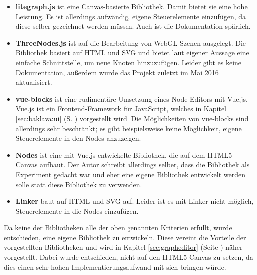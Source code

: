 \begin{itemize}
    \item \textbf{litegraph.js} ist eine Canvas-basierte Bibliothek. Damit bietet sie eine hohe Leistung. Es ist allerdings aufwändig, eigene Steuerelemente einzufügen, da diese selber gezeichnet werden müssen. Auch ist die Dokumentation spärlich. \cite{litegraph}
    \item \textbf{ThreeNodes.js} ist auf die Bearbeitung von WebGL-Szenen ausgelegt. Die Bibliothek basiert auf HTML und SVG und bietet laut eigener Aussage eine einfache Schnittstelle, um neue Knoten hinzuzufügen. Leider gibt es keine Dokumentation, außerdem wurde das Projekt zuletzt im Mai 2016 aktualisiert. \cite{threenodes}
    \item \textbf{vue-blocks} ist eine rudimentäre Umsetzung eines Node-Editors mit Vue.js. Vue.js ist ein Frontend-Framework für JavaScript, welches in Kapitel \ref{sec:baklava:ui} (S. \pageref{sec:baklava:ui}) vorgestellt wird. Die Möglichkeiten von vue-blocks sind allerdings sehr beschränkt; es gibt beispielsweise keine Möglichkeit, eigene Steuerelemente in den Nodes anzuzeigen. \cite{vueblocks}
    \item \textbf{Nodes} ist eine mit Vue.js entwickelte Bibliothek, die auf dem HTML5-Canvas aufbaut. Der Autor schreibt allerdings selber, dass die Bibliothek als Experiment gedacht war und eher eine eigene Bibliothek entwickelt werden solle statt diese Bibliothek zu verwenden. \cite{nodes}
    \item \textbf{Linker} baut auf HTML und SVG auf. Leider ist es mit Linker nicht möglich, Steuerelemente in die Nodes einzufügen. \cite{linker}
\end{itemize}

Da keine der Bibliotheken alle der oben genannten Kriterien erfüllt, wurde entschieden, eine eigene Bibliothek zu entwickeln. Diese vereint die Vorteile der vorgestellten Bibliotheken und wird in Kapitel \ref{sec:grapheditor} (Seite \pageref{sec:grapheditor}) näher vorgestellt. Dabei wurde entschieden, nicht auf den HTML5-Canvas zu setzen, da dies einen sehr hohen Implementierungsaufwand mit sich bringen würde.